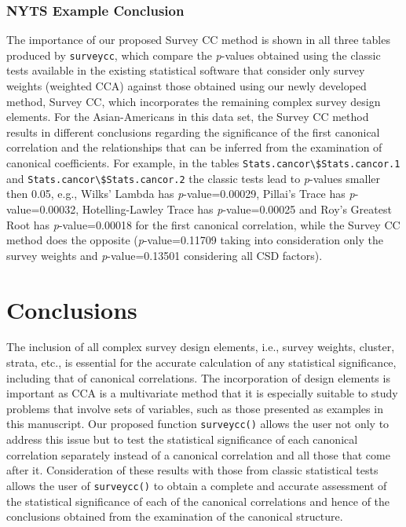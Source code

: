 \hypertarget{nyts-example-conclusion}{%
\subsubsection{NYTS Example Conclusion}\label{nyts-example-conclusion}}

The importance of our proposed Survey CC method is shown in all three tables produced by \texttt{surveycc}, which compare the \emph{p}-values obtained using the classic tests available in the existing statistical software that consider only survey weights (weighted CCA) against those obtained using our newly developed method, Survey CC, which incorporates the remaining complex survey design elements. For the Asian-Americans in this data set, the Survey CC method results in different conclusions regarding the significance of the first canonical correlation and the relationships that can be inferred from the examination of canonical coefficients. For example, in the tables \texttt{Stats.cancor\textbackslash{}\$Stats.cancor.1} and \texttt{Stats.cancor\textbackslash{}\$Stats.cancor.2} the classic tests lead to \emph{p}-values smaller then 0.05, e.g., Wilks' Lambda has \emph{p}-value=0.00029, Pillai's Trace has \emph{p}-value=0.00032, Hotelling-Lawley Trace has \emph{p}-value=0.00025 and Roy's Greatest Root has \emph{p}-value=0.00018 for the first canonical correlation, while the Survey CC method does the opposite (\emph{p}-value=0.11709 taking into consideration only the survey weights and \emph{p}-value=0.13501 considering all CSD factors).

\hypertarget{conclusions}{%
\section{Conclusions}\label{conclusions}}

The inclusion of all complex survey design elements, i.e., survey weights, cluster, strata, etc., is essential for the accurate calculation of any statistical significance, including that of canonical correlations. The incorporation of design elements is important as CCA is a multivariate method that it is especially suitable to study problems that involve sets of variables, such as those presented as examples in this manuscript. Our proposed function \texttt{surveycc()} allows the user not only to address this issue but to test the statistical significance of each canonical correlation separately instead of a canonical correlation and all those that come after it. Consideration of these results with those from classic statistical tests allows the user of \texttt{surveycc()} to obtain a complete and accurate assessment of the statistical significance of each of the canonical correlations and hence of the conclusions obtained from the examination of the canonical structure.

